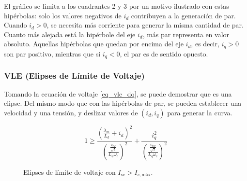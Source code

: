 El gráfico se limita a los cuadrantes 2 y 3 por un motivo ilustrado con estas hipérbolas: solo los valores negativos de \(i_d\) contribuyen a la generación de par. Cuando \(i_d>0\), se necesita más corriente para generar la misma cantidad de par. Cuanto más alejada está la hipérbole del eje \(i_d\), más par representa en valor absoluto. Aquellas hipérbolas que quedan por encima del eje \(i_d\), es decir, \(i_q > 0\) son par positivo, mientras que si \(i_q < 0\), el par es de sentido opuesto.

\subsubsection{VLE (Elipses de Límite de Voltaje)}

Tomando la ecuación de voltaje \ref{eq_vle_dq}, se puede demostrar que es una elipse. Del mismo modo que con las hipérbolas de par, se pueden establecer una velocidad y una tensión, y deslizar valores de \((i_d, i_q)\) para generar la curva.

\begin{equation}
1 \geq \frac{\left(\frac{\lambda_m}{L_d}+i_d\right)^2}{\left(\frac{\frac{V_{\text{DC}}}{\sqrt{3}}}{L_d\omega_e}\right)^2}+\frac{i_q^2}{\left(\frac{\frac{V_{\text{DC}}}{\sqrt{3}}}{L_q\omega_e}\right)^2}
\end{equation}




\begin{figure}[H]
  \centering
  \caption{Elipses de límite de voltaje con $I_{\text{sc}} > I_{s,\text{máx}}$.}
\end{figure}


